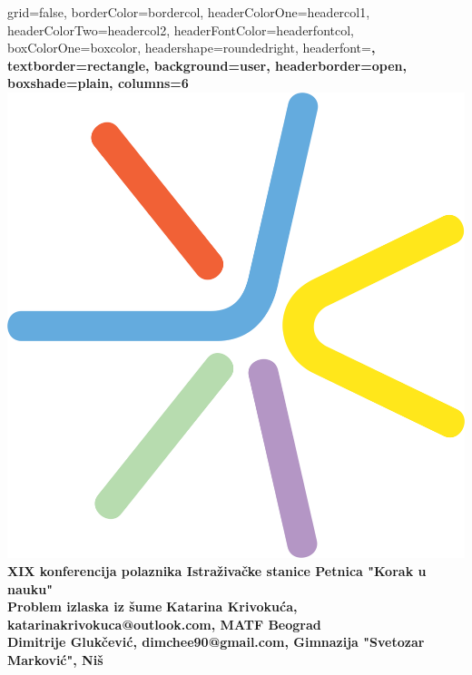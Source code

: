 \documentclass[b1paper,portrait]{template/baposter}
\begin{document}
\begin{poster}
{
	grid=false,
	borderColor=bordercol, %
	headerColorOne=headercol1, %
	headerColorTwo=headercol2, %
	headerFontColor=headerfontcol, %
	boxColorOne=boxcolor, %
	headershape=roundedright, %
	headerfont=\Large\sf\bf, %
	textborder=rectangle,
	background=user,
	headerborder=open, %
	boxshade=plain,
	columns=6
} {\includegraphics[scale=0.15]{PetLogo}}
%
%
%
%
{\small \color{white} 
	\textbf{XIX konferencija polaznika Istra\v ziva\v cke stanice Petnica "Korak u nauku" \\
	\bf  \huge Problem izlaska iz \v sume}
}
{\color{white} 
	\textbf{
			\smaller Katarina Krivoku\' ca,  katarinakrivokuca@outlook.com, MATF Beograd\\
		   	Dimitrije Gluk\v cevi\' c, dimchee90@gmail.com, {Gimnazija "Svetozar Markovi\' c", Ni\v s}   \\
}}
\end{poster}
\end{document}
